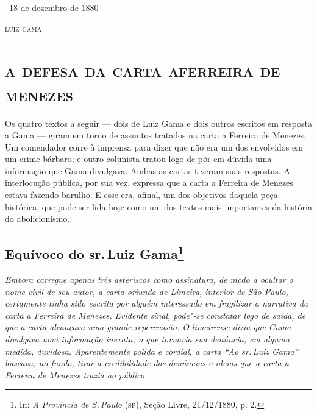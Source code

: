 \bigskip

\hfill\ 18 de dezembro de 1880\smallskip


\hfill\textsc{luiz gama}



\begingroup\makeatletter\@openrightfalse
\part[a defesa da carta a ferreira de menezes]{\textsc{a defesa da carta a\break ferreira de menezes}}

\pagebreak
\mbox{}\vfill
\thispagestyle{empty}

{\footnotesize\noindent
Os quatro textos a seguir --- dois de Luiz Gama e dois outros
escritos em resposta a Gama --- giram em torno de assuntos tratados na
carta a Ferreira de Menezes. Um comendador corre à imprensa para dizer
que não era um dos envolvidos em um crime bárbaro; e outro colunista
tratou logo de pôr em dúvida uma informação que Gama divulgava. Ambas as
cartas tiveram suas respostas. A interlocução pública, por sua vez,
expressa que a carta a Ferreira de Menezes estava fazendo barulho. E
esse era, afinal, um dos objetivos daquela peça histórica, que pode ser
lida hoje como um dos textos mais importantes da história do
abolicionismo.}
\@openrighttrue\makeatother\endgroup

\chapter{Equívoco do sr.\,Luiz Gama\footnote[*]{In: \emph{A Província de S.\,Paulo} (\textsc{sp}), Seção Livre, 21/12/1880, p. 2.}}

\begin{flushleft}
{\footnotesize\itshape
Embora carregue apenas três asteriscos como assinatura, de modo a
ocultar o nome civil de seu autor, a carta oriunda de Limeira, interior
de São Paulo, certamente tinha sido escrita por alguém interessado em
fragilizar a narrativa da carta a Ferreira de Menezes. Evidente sinal,
pode"-se constatar logo de saída, de que a carta alcançava uma grande
repercussão. O limeirense dizia que Gama divulgava uma informação
inexata, o que tornaria sua denúncia, em alguma medida, duvidosa.
Aparentemente polida e cordial, a carta ``Ao sr.\,Luiz Gama'' buscava, no
fundo, tirar a credibilidade das denúncias e ideias que a carta a
Ferreira de Menezes trazia ao público. }
\end{flushleft}

